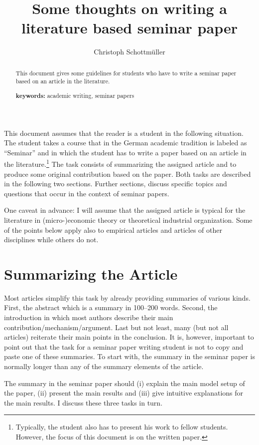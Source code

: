 \documentclass[a4paper,11pt]{article}
\title{Some thoughts on writing a literature based seminar paper}
\author{Christoph Schottmüller}
\begin{document}
\maketitle

\begin{abstract}
This document gives some guidelines for  students who have to write a seminar paper based on an article in the literature.

\textbf{keywords:} academic writing, seminar papers
\end{abstract}

This document assumes that the reader is a student in the following situation. The student takes a course that in the German academic tradition is labeled as ``Seminar'' and in which the student has to write a paper based on an article in the literature.\footnote{Typically, the student also has to present his work to fellow students. However, the focus of this document is on the written paper.} The task consists of summarizing the assigned article and to produce some original contribution based on the paper. Both tasks are described in the following two sections. Further sections, discuss specific topics and questions that occur in the context of seminar papers.

One caveat in advance: I will assume that the assigned article is typical for the literature in (micro-)economic theory or theoretical industrial organization. Some of the points below apply also to empirical articles and articles of other disciplines while others do not.

\section{Summarizing the Article}
\label{sec:summarizing-article}

Most articles simplify this task by already providing summaries of various kinds. First, the abstract which is a summary in 100--200 words. Second, the introduction in which most authors describe their main contribution/mechanism/argument. Last but not least, many (but not all articles) reiterate their main points in the conclusion. It is, however, important to point out that the task for a seminar paper writing student is not to copy and paste one of these summaries. To start with, the summary in the seminar paper is normally longer than any of the summary elements of the article.

The summary in the seminar paper should (i) explain the main model setup of the paper, (ii) present the main results and (iii) give intuitive explanations for the main results. I discuss these three tasks in turn.
\end{document}
